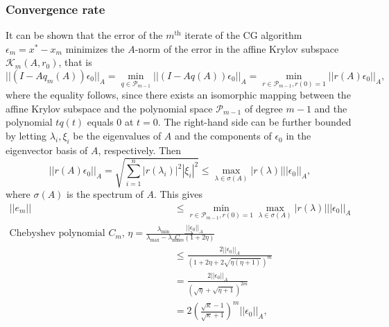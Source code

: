 \subsubsection{Convergence rate}\label{sec:cg_convergence_rate}
It can be shown \cite[lemma 6.28 and theorem 6.29]{iter_method_saad} that the error of the $m^{\text{th}}$ iterate of the CG algorithm $\epsilon_m = x^* - x_m$ minimizes the $A$-norm of the error in the affine Krylov subspace $\mathcal{K}_m(A, r_0)$, that is
\[
  ||(I - Aq_m(A))\epsilon_0||_A = \min_{q \in \mathcal{P}_{m-1}} ||(I - Aq(A))\epsilon_0||_A = \min_{r \in \mathcal{P}_{m-1}, r(0) = 1} ||r(A)\epsilon_0||_A,
\]
where the equality follows, since there exists an isomorphic mapping between the affine Krylov subspace and the polynomial space $\mathcal{P}_{m-1}$ of degree $m-1$ and the polynomial $tq(t)$ equals $0$ at $t=0$. The right-hand side can be further bounded by letting $\lambda_i, \xi_i$ be the eigenvalues of $A$ and the components of $\epsilon_0$ in the eigenvector basis of $A$, respectively. Then
\[
  ||r(A)\epsilon_0||_A = \sqrt{\sum_{i=1}^n |r(\lambda_i)|^2 |\xi_i|^2} \leq \max_{\lambda \in \sigma(A)} |r(\lambda)| ||\epsilon_0||_A,
\]
where $\sigma(A)$ is the spectrum of $A$. This gives
\begin{align*}
  ||e_m||                                                                                                                            & \leq \min_{r \in \mathcal{P}_{m-1}, r(0) = 1} \max_{\lambda \in \sigma(A)} |r(\lambda)| ||\epsilon_0||_A \\
  \text{Chebyshev polynomial } C_m \text{, } \eta=\frac{\lambda_{\text{min}}}{\lambda_{\text{max}}-\lambda_{\text{min}}} \rightarrow & \frac{||\epsilon_0||_A}{C_m(1+2\eta)}                                                                    \\
                                                                                                                                     & \leq \frac{2||\epsilon_0||_A}{\left(1 + 2\eta + 2\sqrt{\eta(\eta+1)}\right)^m}                           \\
                                                                                                                                     & = \frac{2||\epsilon_0||_A}{\left(\sqrt{\eta} + \sqrt{\eta + 1}\right)^{2m}}                              \\
                                                                                                                                     & = 2 \left(\frac{\sqrt{\kappa}-1}{\sqrt{\kappa} + 1}\right)^m ||\epsilon_0||_A,
\end{align*}
